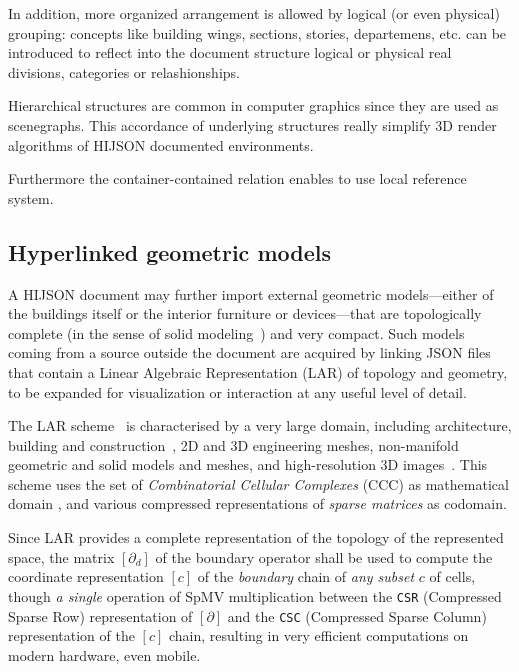 \documentclass{sig-alternate}
\begin{document}
In addition, more organized arrangement is allowed by logical (or even
physical) grouping: concepts like building wings, sections, stories,
departemens, etc. can be introduced to reflect into the document structure
logical or physical real divisions, categories or relashionships.

Hierarchical structures are common in computer graphics since they are used as
scenegraphs. This accordance of underlying structures really simplify 3D
render algorithms of HIJSON documented environments.

Furthermore the container-contained relation enables to use local reference system.


\subsection{Hyperlinked geometric models}\label{optional-lar}

A HIJSON document may further import external geometric models---either of the buildings itself or the interior furniture or devices---that are topologically complete (in the sense of solid modeling~\cite{Requicha:1980:RRS:356827.356833}) and very compact. 
Such models coming from a source outside the document are acquired by linking JSON files that contain a Linear Algebraic Representation (LAR) of topology and geometry, to be expanded for visualization or interaction at any useful level of detail. 

The LAR scheme~\cite{Dicarlo:2014:TNL:2543138.2543294} is characterised by a very large domain, including architecture, building and construction~\cite{paoluzziMS:2014}, 2D and 3D engineering meshes, non-manifold geometric and solid models and meshes, and high-resolution 3D images~\cite{cadanda:2015}. This scheme uses the set of \emph{Combinatorial Cellular Complexes} (CCC) as mathematical domain
\cite{Basak:2010}, and various compressed representations of \emph{sparse matrices} \cite{gemmexp} as codomain. 

Since LAR provides a complete representation of the topology of the represented space,
the matrix $[\partial_d]$ of the boundary operator shall be used to compute the coordinate representation $[c]$ of the \emph{boundary} chain of \emph{any subset} $c$ of cells, though \emph{a single} operation of SpMV multiplication \cite{gemmexp} between the \texttt{CSR} (Compressed Sparse Row) representation of $[\partial]$ and the \texttt{CSC} (Compressed Sparse Column) representation of the $[c]$ chain, resulting in very efficient computations on modern hardware, even mobile.
\end{document}
